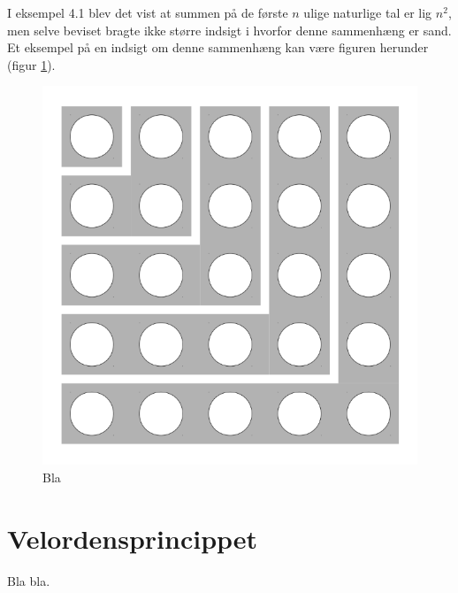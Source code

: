 I eksempel 4.1 blev det vist at summen på de første $n$ ulige naturlige tal er lig $n^2$, men selve beviset bragte ikke større indsigt i hvorfor denne sammenhæng er sand. Et eksempel på en indsigt om denne sammenhæng kan være figuren herunder (figur \ref{fig1_indu}).
\begin{figure}[h]
	\centering
	\includegraphics[scale=0.2]{fig/img/sum_of_n_first_odd_integers.png}
	\caption{Bla} \label{fig1_indu}
\end{figure}
\section{Velordensprincippet}
Bla bla.
